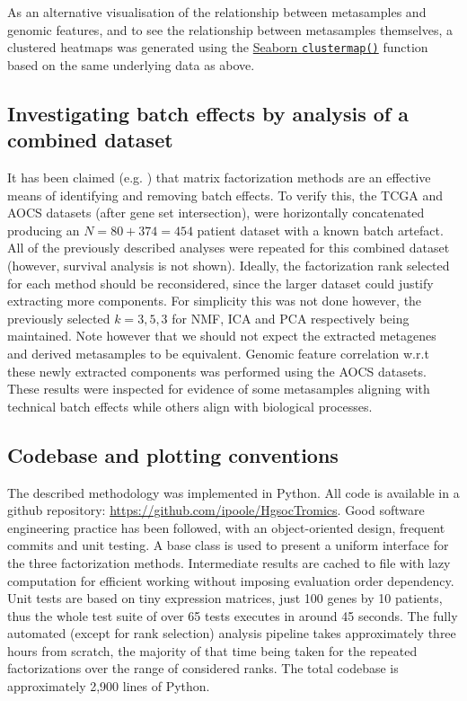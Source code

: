 \documentclass[tikz, 11pt,a4paper,oneside,fleqn]{article}
\begin{document}
As an alternative visualisation of the relationship between metasamples and genomic features, and to see the relationship between metasamples themselves, a clustered heatmaps was generated using the \href{https://seaborn.pydata.org/generated/seaborn.clustermap.html}{Seaborn {\tt clustermap()}} function based on the same underlying data as above.  

\subsection{Investigating batch effects by analysis of a combined dataset}

It has been claimed (e.g. \cite{Stein-OBrien2018,Renard2016}) that matrix factorization methods are an effective means of identifying and removing batch effects.  To verify this, the TCGA and AOCS datasets (after gene set intersection), were horizontally concatenated producing an $N=80+374=454$ patient dataset with a known batch artefact.  All of the previously described analyses were repeated for this combined dataset (however, survival analysis is not shown).  Ideally, the factorization rank selected for each method should be reconsidered, since the larger dataset could justify extracting more components.  For simplicity this was not done however, the previously selected $k = 3,5,3$ for NMF, ICA and PCA respectively being maintained.   Note however that we should not expect the extracted metagenes and derived metasamples to be equivalent. Genomic feature correlation w.r.t these newly extracted components was performed using the AOCS datasets.  These results were inspected for evidence of some metasamples aligning with technical batch effects while others align with biological processes.

\subsection{Codebase and plotting conventions}

The described methodology was implemented in Python.
All code is available in a github repository: \url{https://github.com/ipoole/HgsocTromics}.  Good software engineering practice has been followed, with an object-oriented design, frequent commits and unit testing.  A base class is used to present a uniform interface for the three factorization methods.  Intermediate results are cached to file with lazy computation for efficient working without imposing evaluation order dependency.  Unit tests are based on tiny expression matrices, just 100 genes by 10 patients, thus the whole test suite of over 65 tests executes in around 45 seconds.   The fully automated (except for rank selection) analysis pipeline takes approximately three hours from scratch, the majority of that time being taken for the repeated factorizations over the range of considered ranks.  The total codebase is approximately 2,900 lines of Python.  
\end{document}
